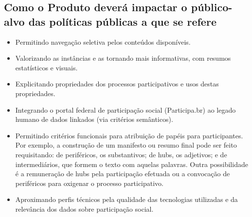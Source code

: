\documentclass[12pt]{article}
\begin{document}
\subsection{Como o Produto deverá impactar o público-alvo das políticas públicas a que se refere}
\begin{itemize}
    \item Permitindo navegação seletiva pelos conteúdos disponíveis.
    \item Valorizando as instâncias e as tornando mais informativas, com resumos estatísticos e visuais.
    \item Explicitando propriedades dos processos participativos e usos destas propriedades.
    \item Integrando o portal federal de participação social (Participa.br) ao legado humano de dados linkados (via critérios semânticos).
    \item Permitindo critérios funcionais para atribuição de papéis para participantes. Por exemplo, a construção de um manifesto ou resumo final pode ser feito requisitando: de periféricos, os substantivos; de hubs, os adjetivos; e de intermediários, que formem o texto com aquelas palavras. Outra possibilidade é a remuneração de hubs pela participação efetuada ou a convocação de periféricos para oxigenar o processo participativo.
    \item Aproximando perfis técnicos pela qualidade das tecnologias utilizadas e da relevância dos dados sobre participação social.
\end{itemize}

\newpage

\newpage

\newpage
\printindex
\newpage

%
\end{document}
